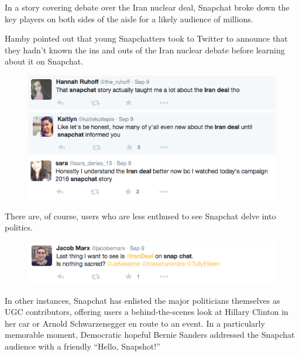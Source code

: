\documentclass[notoc, symmetric, nobib, nols]{towcenter-guideto-book}
\begin{document}
In a story covering debate over the Iran nuclear deal, Snapchat broke down the key players on both sides of the aisle for a likely audience of millions.








Hamby pointed out that young Snapchatters took to Twitter to announce that they hadn't known the ins and outs of the Iran nuclear debate before learning about it on Snapchat.\autocite{KUTSnapchatElection}

\begin{figure}
\begin{center}
\includegraphics[width=1\textwidth]{graphics/CHATAPPS_Page30_Tweet1.png}
\includegraphics[width=1\textwidth]{graphics/CHATAPPS_Page30_Tweet2.png}
\includegraphics[width=1\textwidth]{graphics/CHATAPPS_Page30_Tweet3.png}
\end{center}
\end{figure}

There are, of course, users who are less enthused to see Snapchat delve into politics.

\begin{figure}
\begin{center}
\includegraphics[width=1\textwidth]{graphics/CHATAPPS_Page30_Tweet4.png}
\end{center}
\end{figure}
\vspace{2in}
In other instances, Snapchat has enlisted the major politicians themselves as UGC contributors, offering users a behind-the-scenes look at Hillary Clinton in her car or Arnold Schwarzenegger en route to an event. In a particularly memorable moment, Democratic hopeful Bernie Sanders addressed the Snapchat audience with a friendly ``Hello, Snapshot!''  
\end{document}
